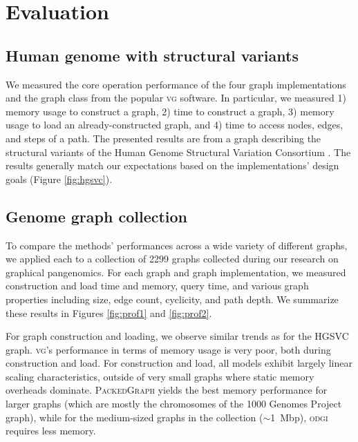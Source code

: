 \documentclass{article}
\begin{document}

\section{Evaluation}

\subsection{Human genome with structural variants}

We measured the core operation performance of the four graph implementations and the graph class from the popular \textsc{vg} software.
In particular, we measured 1) memory usage to construct a graph, 2) time to construct a graph, 3) memory usage to load an already-constructed graph, and 4) time to access nodes, edges, and steps of a path.
The presented results are from a graph describing the structural variants of the Human Genome Structural Variation Consortium \cite{chaisson2019multi}.
The results generally match our expectations based on the implementations' design goals (Figure \ref{fig:hgsvc}).

\subsection{Genome graph collection}

To compare the methods' performances across a wide variety of different graphs, we applied each to a collection of 2299 graphs collected during our research on graphical pangenomics.
For each graph and graph implementation, we measured construction and load time and memory, query time, and various graph properties including size, edge count, cyclicity, and path depth.
We summarize these results in Figures \ref{fig:prof1} and \ref{fig:prof2}.

For graph construction and loading, we observe similar trends as for the HGSVC graph.
\textsc{vg}'s performance in terms of memory usage is very poor, both during construction and load.
For construction and load, all models exhibit largely linear scaling characteristics, outside of very small graphs where static memory overheads dominate.
\textsc{PackedGraph} yields the best memory performance for larger graphs (which are mostly the chromosomes of the 1000 Genomes Project graph), while for the medium-sized graphs in the collection ($\sim$1~Mbp), \textsc{odgi} requires less memory.
\end{document}

